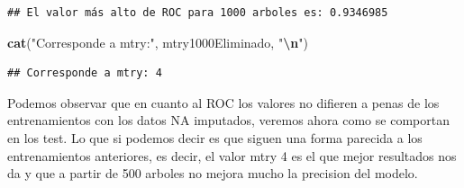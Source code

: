 \documentclass[
]{article}
\newenvironment{Shaded}{\begin{snugshade}}{\end{snugshade}}
\newcommand{\CommentTok}[1]{\textcolor[rgb]{0.56,0.35,0.01}{\textit{#1}}}
\newcommand{\FloatTok}[1]{\textcolor[rgb]{0.00,0.00,0.81}{#1}}
\newcommand{\FunctionTok}[1]{\textcolor[rgb]{0.13,0.29,0.53}{\textbf{#1}}}
\newcommand{\NormalTok}[1]{#1}
\newcommand{\OtherTok}[1]{\textcolor[rgb]{0.56,0.35,0.01}{#1}}
\newcommand{\SpecialCharTok}[1]{\textcolor[rgb]{0.81,0.36,0.00}{\textbf{#1}}}
\newcommand{\StringTok}[1]{\textcolor[rgb]{0.31,0.60,0.02}{#1}}
\begin{document}
\begin{Shaded}
\end{Shaded}

\begin{verbatim}
## El valor más alto de ROC para 1000 arboles es: 0.9346985
\end{verbatim}

\begin{Shaded}
\begin{Highlighting}[]
\FunctionTok{cat}\NormalTok{(}\StringTok{"Corresponde a mtry:"}\NormalTok{, mtry1000Eliminado, }\StringTok{"}\SpecialCharTok{\textbackslash{}n}\StringTok{"}\NormalTok{)}
\end{Highlighting}
\end{Shaded}

\begin{verbatim}
## Corresponde a mtry: 4
\end{verbatim}

Podemos observar que en cuanto al ROC los valores no difieren a penas de
los entrenamientos con los datos NA imputados, veremos ahora como se
comportan en los test. Lo que si podemos decir es que siguen una forma
parecida a los entrenamientos anteriores, es decir, el valor mtry 4 es
el que mejor resultados nos da y que a partir de 500 arboles no mejora
mucho la precision del modelo.
\end{document}
